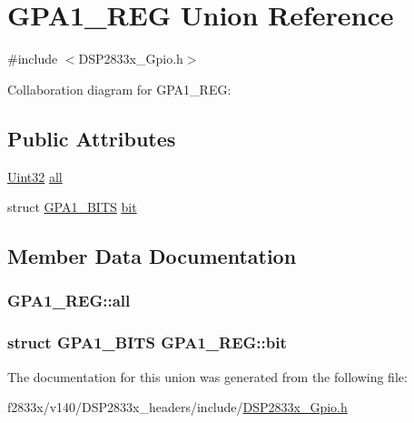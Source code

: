 \hypertarget{union_g_p_a1___r_e_g}{}\section{G\+P\+A1\+\_\+\+R\+E\+G Union Reference}
\label{union_g_p_a1___r_e_g}


{\ttfamily \#include $<$D\+S\+P2833x\+\_\+\+Gpio.\+h$>$}



Collaboration diagram for G\+P\+A1\+\_\+\+R\+E\+G\+:
\subsection*{Public Attributes}
\begin{DoxyCompactItemize}
\item 
\hyperlink{_d_s_p2833x___device_8h_aba99025e657f892beb7ff31cecf64653}{Uint32} \hyperlink{union_g_p_a1___r_e_g_a4570f5195599b92ad0084dd3bbc9b17d}{all}
\item 
struct \hyperlink{struct_g_p_a1___b_i_t_s}{G\+P\+A1\+\_\+\+B\+I\+T\+S} \hyperlink{union_g_p_a1___r_e_g_a36344dcd055b6bac21ff994fc323cda8}{bit}
\end{DoxyCompactItemize}


\subsection{Member Data Documentation}
\hypertarget{union_g_p_a1___r_e_g_a4570f5195599b92ad0084dd3bbc9b17d}{}
\subsubsection[{all}]{ G\+P\+A1\+\_\+\+R\+E\+G\+::all}\label{union_g_p_a1___r_e_g_a4570f5195599b92ad0084dd3bbc9b17d}
\hypertarget{union_g_p_a1___r_e_g_a36344dcd055b6bac21ff994fc323cda8}{}
\subsubsection[{bit}]{\setlength{\rightskip}{0pt plus 5cm}struct {\bf G\+P\+A1\+\_\+\+B\+I\+T\+S} G\+P\+A1\+\_\+\+R\+E\+G\+::bit}\label{union_g_p_a1___r_e_g_a36344dcd055b6bac21ff994fc323cda8}


The documentation for this union was generated from the following file\+:\begin{DoxyCompactItemize}
\item 
f2833x/v140/\+D\+S\+P2833x\+\_\+headers/include/\hyperlink{_d_s_p2833x___gpio_8h}{D\+S\+P2833x\+\_\+\+Gpio.\+h}\end{DoxyCompactItemize}
